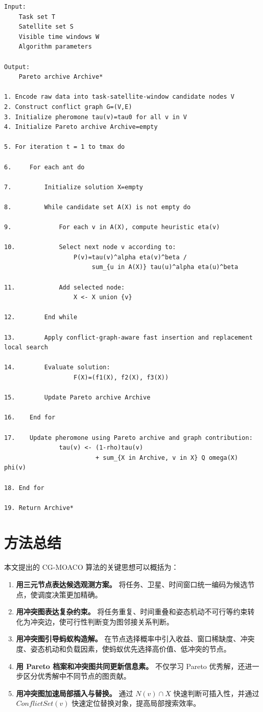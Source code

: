 \documentclass[UTF8,a4paper,12pt]{ctexart}
\begin{document}
\begin{verbatim}
Input:
    Task set T
    Satellite set S
    Visible time windows W
    Algorithm parameters

Output:
    Pareto archive Archive*

1. Encode raw data into task-satellite-window candidate nodes V
2. Construct conflict graph G=(V,E)
3. Initialize pheromone tau(v)=tau0 for all v in V
4. Initialize Pareto archive Archive=empty

5. For iteration t = 1 to tmax do

6.     For each ant do

7.         Initialize solution X=empty

8.         While candidate set A(X) is not empty do

9.             For each v in A(X), compute heuristic eta(v)

10.            Select next node v according to:
                   P(v)=tau(v)^alpha eta(v)^beta /
                        sum_{u in A(X)} tau(u)^alpha eta(u)^beta

11.            Add selected node:
                   X <- X union {v}

12.        End while

13.        Apply conflict-graph-aware fast insertion and replacement local search

14.        Evaluate solution:
                   F(X)=(f1(X), f2(X), f3(X))

15.        Update Pareto archive Archive

16.    End for

17.    Update pheromone using Pareto archive and graph contribution:
               tau(v) <- (1-rho)tau(v)
                         + sum_{X in Archive, v in X} Q omega(X) phi(v)

18. End for

19. Return Archive*
\end{verbatim}

\section{方法总结}

本文提出的 CG-MOACO 算法的关键思想可以概括为：

\begin{enumerate}[label=\arabic*.]
    \item \textbf{用三元节点表达候选观测方案。} 将任务、卫星、时间窗口统一编码为候选节点，使调度决策更加精确。
    \item \textbf{用冲突图表达复杂约束。} 将任务重复、时间重叠和姿态机动不可行等约束转化为冲突边，使可行性判断变为图邻接关系判断。
    \item \textbf{用冲突图引导蚂蚁构造解。} 在节点选择概率中引入收益、窗口稀缺度、冲突度、姿态机动和负载因素，使蚂蚁优先选择高价值、低冲突的节点。
    \item \textbf{用 Pareto 档案和冲突图共同更新信息素。} 不仅学习 Pareto 优秀解，还进一步区分优秀解中不同节点的图贡献。
    \item \textbf{用冲突图加速局部插入与替换。} 通过 $N(v)\cap X$ 快速判断可插入性，并通过 $ConflictSet(v)$ 快速定位替换对象，提高局部搜索效率。
\end{enumerate}
\end{document}
